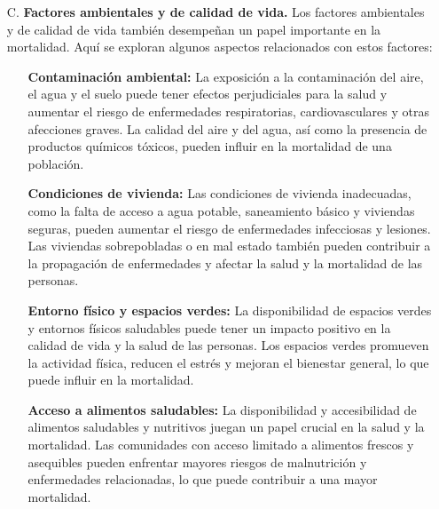 \documentclass[8pt,a4paper]{beamer}
\begin{document}
{\begin{frame}{}
\setlength{\parskip}{3px}
\justifying
\begin{block}{}
\setlength{\parskip}{3px}
\justifying
\begin{enumerate}
\setlength{\parskip}{3px}
\justifying
\item[C.] \textbf{Factores ambientales y de calidad de vida.} Los factores ambientales y de calidad de vida también desempeñan un papel importante en la mortalidad. Aquí se exploran algunos aspectos relacionados con estos factores:
\begin{enumerate}
\setlength{\parskip}{3px}
\justifying
\item[\ding{99}] \textbf{Contaminación ambiental:} La exposición a la contaminación del aire, el agua y el suelo puede tener efectos perjudiciales para la salud y aumentar el riesgo de enfermedades respiratorias, cardiovasculares y otras afecciones graves. La calidad del aire y del agua, así como la presencia de productos químicos tóxicos, pueden influir en la mortalidad de una población.

\item[\ding{99}] \textbf{Condiciones de vivienda:} Las condiciones de vivienda inadecuadas, como la falta de acceso a agua potable, saneamiento básico y viviendas seguras, pueden aumentar el riesgo de enfermedades infecciosas y lesiones. Las viviendas sobrepobladas o en mal estado también pueden contribuir a la propagación de enfermedades y afectar la salud y la mortalidad de las personas.

\item[\ding{99}] \textbf{Entorno físico y espacios verdes:} La disponibilidad de espacios verdes y entornos físicos saludables puede tener un impacto positivo en la calidad de vida y la salud de las personas. Los espacios verdes promueven la actividad física, reducen el estrés y mejoran el bienestar general, lo que puede influir en la mortalidad.
\end{enumerate}
\end{enumerate}
\end{block}
\end{frame}

\begin{frame}{}
\setlength{\parskip}{3px}
\justifying
\begin{block}{}
\setlength{\parskip}{3px}
\justifying
\begin{enumerate}
\setlength{\parskip}{3px}
\justifying
\item[{}] 
\begin{enumerate}
\setlength{\parskip}{3px}
\justifying
\item[\ding{99}] \textbf{Acceso a alimentos saludables:} La disponibilidad y accesibilidad de alimentos saludables y nutritivos juegan un papel crucial en la salud y la mortalidad. Las comunidades con acceso limitado a alimentos frescos y asequibles pueden enfrentar mayores riesgos de malnutrición y enfermedades relacionadas, lo que puede contribuir a una mayor mortalidad.


\end{enumerate}
\end{enumerate}
\end{block}
\end{frame}}
\end{document}
